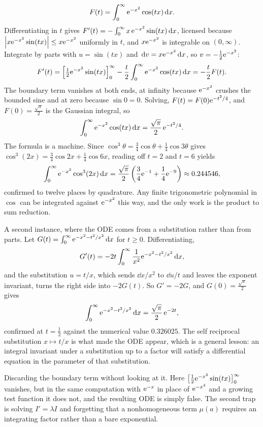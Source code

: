 \begin{worked}
\[F(t)=\int_0^{\infty}\mathrm{e}^{-x^{2}}\cos(tx)\,\mathrm{d} x.\]
Differentiating in $t$ gives $F'(t)=-\int_0^\infty x\,\mathrm{e}^{-x^{2}}\sin(tx)\,\mathrm{d} x$, licensed because $\left\lvert x\mathrm{e}^{-x^{2}}\sin(tx)\right\rvert\leq x\mathrm{e}^{-x^{2}}$ uniformly in $t$, and $x\mathrm{e}^{-x^{2}}$ is integrable on $(0,\infty)$. Integrate by parts with $u=\sin(tx)$ and $\,\mathrm{d} v=x\mathrm{e}^{-x^{2}}\,\mathrm{d} x$, so $v=-\tfrac12\mathrm{e}^{-x^{2}}$:
\[F'(t)=\Bigl[\tfrac12\mathrm{e}^{-x^{2}}\sin(tx)\Bigr]_0^{\infty}-\frac{t}{2}\int_0^\infty \mathrm{e}^{-x^{2}}\cos(tx)\,\mathrm{d} x=-\frac{t}{2}F(t).\]
The boundary term vanishes at both ends, at infinity because $\mathrm{e}^{-x^{2}}$ crushes the bounded sine and at zero because $\sin 0=0$. Solving, $F(t)=F(0)\mathrm{e}^{-t^{2}/4}$, and $F(0)=\tfrac{\sqrt{\pi}}{2}$ is the Gaussian integral, so
\[\int_0^{\infty}\mathrm{e}^{-x^{2}}\cos(tx)\,\mathrm{d} x=\frac{\sqrt{\pi}}{2}\,\mathrm{e}^{-t^{2}/4}.\]
The formula is a machine. Since $\cos^{3}\theta=\tfrac34\cos\theta+\tfrac14\cos3\theta$ gives $\cos^{3}(2x)=\tfrac34\cos2x+\tfrac14\cos6x$, reading off $t=2$ and $t=6$ yields
\[\int_0^{\infty}\mathrm{e}^{-x^{2}}\cos^{3}(2x)\,\mathrm{d} x=\frac{\sqrt{\pi}}{2}\left(\frac34\mathrm{e}^{-1}+\frac14\mathrm{e}^{-9}\right)\approx0.244546,\]
confirmed to twelve places by quadrature. Any finite trigonometric polynomial in $\cos$ can be integrated against $\mathrm{e}^{-x^{2}}$ this way, and the only work is the product to sum reduction.

A second instance, where the ODE comes from a substitution rather than from parts. Let $G(t)=\int_0^{\infty}\mathrm{e}^{-x^{2}-t^{2}/x^{2}}\,\mathrm{d} x$ for $t\geq0$. Differentiating,
\[G'(t)=-2t\int_0^{\infty}\frac{1}{x^{2}}\mathrm{e}^{-x^{2}-t^{2}/x^{2}}\,\mathrm{d} x,\]
and the substitution $u=t/x$, which sends $\dd x/x^{2}$ to $\dd u/t$ and leaves the exponent invariant, turns the right side into $-2G(t)$. So $G'=-2G$, and $G(0)=\tfrac{\sqrt\pi}{2}$ gives
\[\int_0^{\infty}\mathrm{e}^{-x^{2}-t^{2}/x^{2}}\,\mathrm{d} x=\frac{\sqrt{\pi}}{2}\,\mathrm{e}^{-2t},\]
confirmed at $t=\tfrac12$ against the numerical value $0.326025$. The self reciprocal substitution $x\mapsto t/x$ is what made the ODE appear, which is a general lesson: an integral invariant under a substitution up to a factor will satisfy a differential equation in the parameter of that substitution.
\end{worked}

\begin{trap}
Discarding the boundary term without looking at it. Here $\bigl[\tfrac12\mathrm{e}^{-x^{2}}\sin(tx)\bigr]_0^\infty$ vanishes, but in the same computation with $\mathrm{e}^{-x}$ in place of $\mathrm{e}^{-x^{2}}$ and a growing test function it does not, and the resulting ODE is simply false. The second trap is solving $I'=\lambda I$ and forgetting that a nonhomogeneous term $\mu(a)$ requires an integrating factor rather than a bare exponential.
\end{trap}

